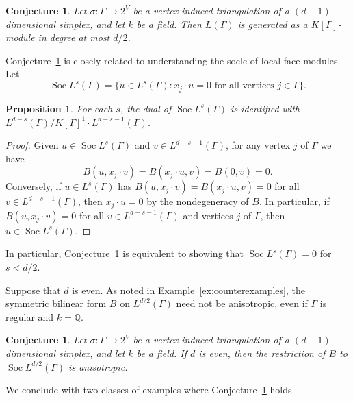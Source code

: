 \documentclass[11pt]{article}
\newtheorem{prop}[theo]{Proposition}
\newtheorem{conj}[theo]{Conjecture}
\theoremstyle{definition}
\numberwithin{equation}{section}
\numberwithin{equation}{section}
\begin{document}
\begin{conj}\label{conj:generation}
Let $\sigma \colon \Gamma \to 2^V$ be a vertex-induced triangulation of a $(d-1)$-dimensional simplex, and let $k$ be a field. Then $L(\Gamma)$ is generated as a $K[\Gamma]$-module in degree at most $d/2$. 
\end{conj}

Conjecture~\ref{conj:generation} is closely related to understanding the socle of local face modules. Let 
$$\operatorname{Soc} L^s(\Gamma) = \{u \in L^s(\Gamma) : x_j \cdot u = 0 \text{ for all vertices }j \in \Gamma\}.$$
\begin{prop}
For each $s$, the dual of $\operatorname{Soc} L^s(\Gamma)$ is identified with $L^{d - s}(\Gamma)/K[\Gamma]^1 \cdot L^{d - s - 1}(\Gamma)$. 
\end{prop}

\begin{proof}
Given $u \in \operatorname{Soc} L^s(\Gamma)$ and $v \in L^{d-s-1}(\Gamma)$, for any vertex $j$ of $\Gamma$ we have
$$B(u, x_j \cdot v) = B(x_j \cdot u, v) = B(0, v) = 0.$$
Conversely, if $u \in L^s(\Gamma)$ has $B(u, x_j \cdot v) = B(x_j \cdot u, v) = 0$ for all $v \in L^{d-s-1}(\Gamma)$,  then $x_j \cdot u = 0$ by the nondegeneracy of $B$. In particular, if  $B(u, x_j \cdot v)  = 0$ for all $v \in L^{d-s-1}(\Gamma)$ and vertices $j$ of $\Gamma$, then $u \in \operatorname{Soc} L^{s}(\Gamma)$. 
\end{proof}

In particular, Conjecture~\ref{conj:generation} is equivalent to showing that $\operatorname{Soc}L^s(\Gamma) = 0$ for \mbox{$s < d/2$}. 

Suppose that $d$ is even. As noted in Example~\ref{ex:counterexamples}, the symmetric bilinear form $B$ on $L^{d/2}(\Gamma)$ need not be anisotropic, even if $\Gamma$ is regular and $k = \mathbb{Q}$. 


\begin{conj}\label{conj:socleanisotropy}
Let $\sigma \colon \Gamma \to 2^V$ be a vertex-induced triangulation of a $(d-1)$-dimensional simplex, and let $k$ be a field. If $d$ is even, then the restriction of $B$ to $\operatorname{Soc} L^{d/2}(\Gamma)$ is anisotropic. 
\end{conj}

We conclude with two classes of examples where Conjecture~\ref{conj:socleanisotropy} holds. 
\end{document}
